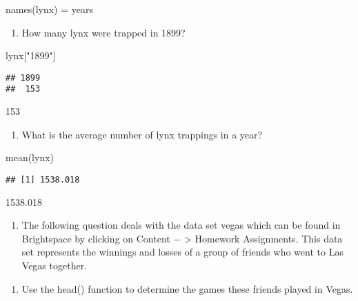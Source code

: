 \documentclass[]{article}
\newenvironment{Shaded}{\begin{snugshade}}{\end{snugshade}}
\newcommand{\FunctionTok}[1]{\textcolor[rgb]{0.00,0.00,0.00}{#1}}
\newcommand{\NormalTok}[1]{#1}
\newcommand{\OtherTok}[1]{\textcolor[rgb]{0.56,0.35,0.01}{#1}}
\newcommand{\StringTok}[1]{\textcolor[rgb]{0.31,0.60,0.02}{#1}}
\providecommand{\tightlist}{%
  \setlength{\itemsep}{0pt}\setlength{\parskip}{0pt}}
\begin{document}
\begin{Shaded}
\begin{Highlighting}[]
\FunctionTok{names}\NormalTok{(lynx) }\OtherTok{=}\NormalTok{ years}
\end{Highlighting}
\end{Shaded}

\begin{enumerate}
\def\labelenumi{(\alph{enumi})}
\setcounter{enumi}{3}
\tightlist
\item
  How many lynx were trapped in 1899?
\end{enumerate}

\begin{Shaded}
\begin{Highlighting}[]
\NormalTok{lynx[}\StringTok{"1899"}\NormalTok{]}
\end{Highlighting}
\end{Shaded}

\begin{verbatim}
## 1899 
##  153
\end{verbatim}

153

\begin{enumerate}
\def\labelenumi{(\alph{enumi})}
\setcounter{enumi}{4}
\tightlist
\item
  What is the average number of lynx trappings in a year?
\end{enumerate}

\begin{Shaded}
\begin{Highlighting}[]
\FunctionTok{mean}\NormalTok{(lynx)}
\end{Highlighting}
\end{Shaded}

\begin{verbatim}
## [1] 1538.018
\end{verbatim}

1538.018

\begin{enumerate}
\def\labelenumi{\arabic{enumi}.}
\setcounter{enumi}{2}
\tightlist
\item
  The following question deals with the data set vegas which can be
  found in Brightspace by clicking on Content − \textgreater{} Homework
  Assignments. This data set represents the winnings and losses of a
  group of friends who went to Las Vegas together.
\end{enumerate}

\begin{enumerate}
\def\labelenumi{(\alph{enumi})}
\tightlist
\item
  Use the head() function to determine the games these friends played in
  Vegas.
\end{enumerate}
\end{document}
